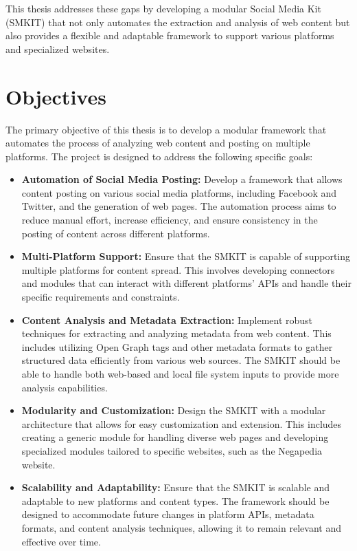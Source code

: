 This thesis addresses these gaps by developing a modular Social Media Kit (SMKIT) that not only automates the extraction and analysis of web content but also provides a flexible and adaptable framework to support various platforms and specialized websites.


\section{Objectives}
\label{sec:objectives}
The primary objective of this thesis is to develop a modular framework that automates the process of analyzing web content and posting on multiple platforms. The project is designed to address the following specific goals:

\begin{itemize}
    \item \textbf{Automation of Social Media Posting:} Develop a framework that allows content posting on various social media platforms, including Facebook and Twitter, and the generation of web pages. The automation process aims to reduce manual effort, increase efficiency, and ensure consistency in the posting of content across different platforms.

    \item \textbf{Multi-Platform Support:} Ensure that the SMKIT is capable of supporting multiple platforms for content spread. This involves developing connectors and modules that can interact with different platforms' APIs and handle their specific requirements and constraints.

    \item \textbf{Content Analysis and Metadata Extraction:} Implement robust techniques for extracting and analyzing metadata from web content. This includes utilizing Open Graph tags and other metadata formats to gather structured data efficiently from various web sources. The SMKIT should be able to handle both web-based and local file system inputs to provide more analysis capabilities.

    \item \textbf{Modularity and Customization:} Design the SMKIT with a modular architecture that allows for easy customization and extension. This includes creating a generic module for handling diverse web pages and developing specialized modules tailored to specific websites, such as the Negapedia website.

    \item \textbf{Scalability and Adaptability:} Ensure that the SMKIT is scalable and adaptable to new platforms and content types. The framework should be designed to accommodate future changes in platform APIs, metadata formats, and content analysis techniques, allowing it to remain relevant and effective over time.


\end{itemize}
